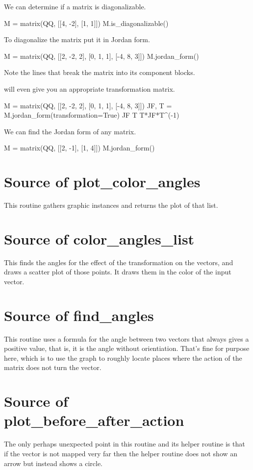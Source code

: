 We can determine if a matrix is diagonalizable.
\begin{sageoutput}
M =  matrix(QQ, [[4, -2], [1, 1]])  
M.is_diagonalizable()
\end{sageoutput}
\noindent
To diagonalize the matrix put it in Jordan form.
\begin{sageoutput}
M =  matrix(QQ, [[2, -2, 2], [0, 1, 1], [-4, 8, 3]])  
M.jordan_form()
\end{sageoutput}
\noindent 
Note the \inlinecode{-+-+-} lines that break the matrix into its component
blocks.

\Sage{} will even give you an appropriate transformation matrix.
\begin{sageoutput}[d,0,1]
M =  matrix(QQ, [[2, -2, 2], [0, 1, 1], [-4, 8, 3]])  
JF, T = M.jordan_form(transformation=True)
JF
T
T*JF*T^(-1)
\end{sageoutput}

We can find the Jordan form of any matrix.
\begin{sageoutput}
M =  matrix(QQ, [[2, -1], [1, 4]])  
M.jordan_form()
\end{sageoutput}



\section{Source of plot\_color\_angles}
This routine gathers graphic instances and returns the plot of that list.


\section{Source of color\_angles\_list}
This finds the angles for the effect of the transformation on the vectors,
and draws a scatter plot of those points.
It draws them in the color of the input vector.


\section{Source of find\_angles}
This routine uses a formula for the angle between two vectors that 
always gives a positive value, that is, it is the angle without orientiation.
That's fine for purpose here, which is to use the graph to 
roughly locate places where the action of the matrix does not turn the
vector. 



\section{Source of plot\_before\_after\_action}
The only perhaps unexpected point in this routine and its helper routine
is that if the vector is not mapped very far then the helper
routine does not show an arrow but instead shows a circle.



\endinput

TODO

1) Does python intro show 
   > x, y = 5, 7
construct?